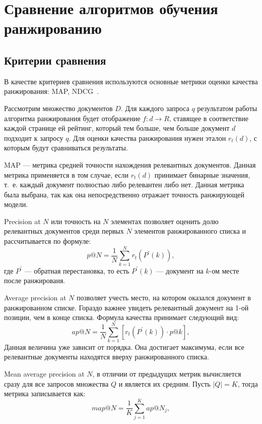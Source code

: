 \chapter{Сравнение алгоритмов обучения ранжированию}

\section{Критерии сравнения}

В качестве критериев сравнения используются основные метрики оценки качества ранжирования: MAP, NDCG~\cite{metrics}. 

Рассмотрим множество документов $D$. Для каждого запроса $q$ результатом работы алгоритма ранжирования будет отображение $f: d \to R$, ставящее в соответствие каждой странице ей рейтинг, который тем больше, чем больше документ $d$ подходит к запросу $q$. Для оценки качества ранжирования нужен эталон $r_t(d)$, с которым будут сравниваться результаты.
 
MAP --- метрика средней точности нахождения релевантных документов. Данная метрика применяется в том случае, если $r_t(d)$ принимает бинарные значения, т.~е. каждый документ полностью либо релевантен либо нет. Данная метрика была выбрана, так как она непосредственно отражает точность ранжирующей модели.

Precision at $N$ или точность на $N$ элементах позволяет оценить долю релевантных документов среди первых $N$ элементов ранжированного списка и рассчитывается по формуле:
\begin{equation}
	\label{eq:map1}
	p @ N=\frac{1}{N} \sum_{k=1}^N r_t(P^{\prime}(k)),
\end{equation}
где $P^{\prime}$ --- обратная перестановка, то есть $P^{\prime}(k)$ --- документ на $k$-ом месте после ранжированя.

Average precision at $N$ позволяет учесть место, на котором оказался документ в ранжированном списке. Гораздо важнее увидеть релевантный документ на 1-ой позиции, чем в конце списка. Формула качества принимает
следующий вид: 
\begin{equation}
	\label{eq:map2}
	ap @ N=\frac{1}{N} \sum_{k=1}^N [r_t(P^{\prime}(k)) \cdot p@k],
\end{equation}
Данная величина уже зависит от порядка. Она достигает максимума, если все релевантные документы находятся вверху ранжированного списка.

Mean average precision at $N$, в отличии от предыдущих метрик вычисляется сразу для все запросов множества $Q$ и является их средним. Пусть $|Q| = K$, тогда метрика записывается как:
\begin{equation}
	\label{eq:map3}
	map @ N=\frac{1}{K} \sum_{j=1}^K ap @ N_j,
\end{equation}

